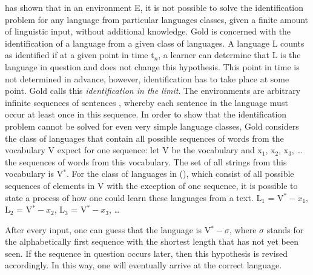 \cite{Gold67a} has shown that in an environment E, it is not possible to solve the identification
problem for any language from particular languages classes, given a finite amount of linguistic input, without additional knowledge. Gold is concerned
with the identification of a language from a given class of languages. A language L counts as identified if at a given point in time
t$_n$, a learner can determine that L is the language in question and does not change this hypothesis.
This point in time is not determined in advance, however, identification has to take place at some point.
Gold calls this \emph{identification in the limit}.
The environments are  arbitrary infinite sequences of sentences , whereby each sentence in the language must occur at least once in this sequence. In order
to show that the identification problem cannot be solved for even very simple language classes, Gold
considers the class of languages that contain all possible sequences of words from the vocabulary V expect
for one sequence: let V be the vocabulary and x$_1$, x$_2$, x$_3$, \ldots{} the sequences of words from this vocabulary.
The set of all strings from this vocabulary is V$^*$. For the class of languages in (), which consist of all possible
sequences of elements in V with the exception of one sequence, it is possible to state a process of how one could
learn these languages from a text.
\ea
L$_1$ = V$^* - x_1$, L$_2$ = V$^* - x_2$, L$_3$ = V$^* - x_3$, \ldots
\z

\noindent
After every input, one can guess that the language is V$^* - \sigma$, where $\sigma$ stands for the alphabetically first
sequence with the shortest length that has not yet been seen. If the sequence in question occurs later, then this hypothesis
is revised accordingly. In this way, one will eventually arrive at the correct language.


